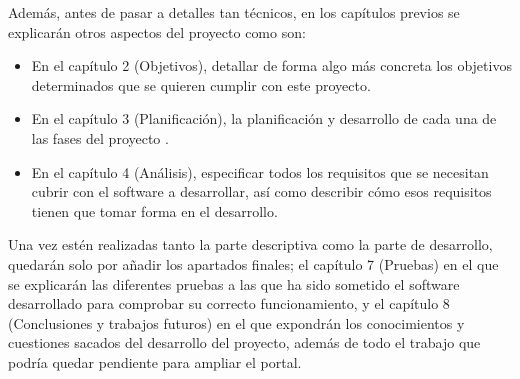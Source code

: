 \bigskip
Además, antes de pasar a detalles tan técnicos, en los capítulos previos se explicarán otros aspectos del proyecto como son:

\begin{itemize}
  \item En el capítulo 2 (Objetivos), detallar de forma algo más concreta los objetivos determinados que se quieren cumplir con este proyecto.
  \item En el capítulo 3 (Planificación), la planificación y desarrollo de cada una de las fases del proyecto .
  \item En el capítulo 4 (Análisis), especificar todos los requisitos que se necesitan cubrir con el software a desarrollar, así como describir cómo esos requisitos tienen que tomar forma en el desarrollo.
\end{itemize}

\bigskip
Una vez estén realizadas tanto la parte descriptiva como la parte de desarrollo, quedarán solo por añadir los apartados finales; el capítulo 7 (Pruebas) en el que se explicarán las diferentes pruebas a las que ha sido sometido el software desarrollado para comprobar su correcto funcionamiento, y el capítulo 8 (Conclusiones y trabajos futuros) en el que expondrán los conocimientos y cuestiones sacados del desarrollo del proyecto, además de todo el trabajo que podría quedar pendiente para ampliar el portal.

